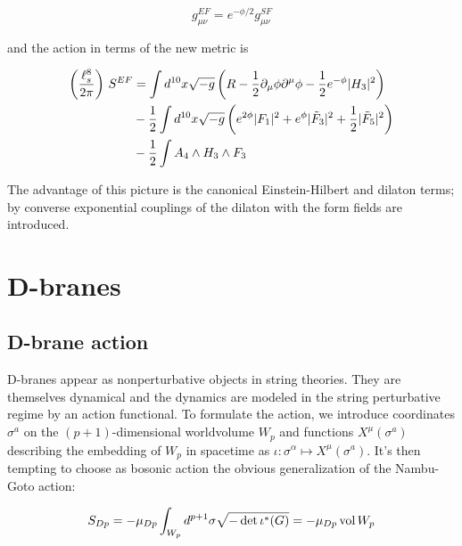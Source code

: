 \begin{equation}
	g_{\mu\nu}^{EF} = e^{-\phi/2} g_{\mu\nu}^{SF}
	\label{}
\end{equation}

and the action in terms of the new metric is\cite{BBS}

\begin{align}
\begin{split}
	\left(\frac{\ell_s^8}{2\pi}\right) \,S^{EF} &=  \int d^{10} x \sqrt{-g} \left( R - \frac{1}{2} \partial_\mu \phi \partial^\mu \phi - \frac{1}{2} e^{-\phi} |H_3|^2 \right)\\
	&- \frac{1}{2}  \int d^{10}x \sqrt{-g} \left( e^{2\phi} |F_1|^2 + e^\phi |\tilde F_3|^2 + \frac{1}{2} |\tilde F_5|^2 \right)\\
	&- \frac{1}{2}  \int A_4 \wedge H_3 \wedge F_3 
	\label{}
\end{split}
\end{align}

The advantage of this picture is the canonical Einstein-Hilbert and dilaton terms; by converse exponential couplings of the dilaton with the form fields are introduced.


\section{D-branes}

\subsection{D-brane action}

D-branes appear as nonperturbative objects in string theories. They are themselves dynamical and the dynamics are modeled in the string perturbative regime by an action functional\cite{ibanezU}. To formulate the action, we introduce coordinates $\sigma^a$ on the $(p+1)$-dimensional worldvolume $W_p$ and functions $X^\mu(\sigma^a)$ describing the embedding of $W_p$ in spacetime as $\iota:\sigma^\alpha \mapsto X^\mu(\sigma^a)$. It's then tempting to choose as bosonic action the obvious generalization of the Nambu-Goto action:

\begin{equation}
	S_{Dp} = - \mu_{Dp} \int_{W_p} d^{p+1} \sigma \sqrt{-\det \iota^*(G)} = - \mu_{Dp} \operatorname{vol} W_p
	\label{naiveDbrane}
\end{equation}

